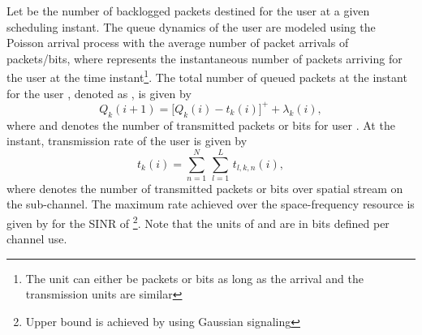 Let  be the number of backlogged packets destined for the user  at a given scheduling instant. The queue dynamics of the user  are modeled using the Poisson arrival process with the average number of packet arrivals of  packets/bits, where  represents the instantaneous number of packets arriving for the user  at the  time instant\footnote{The unit can either be packets or bits as long as the arrival and the transmission units are similar}. The total number of queued packets at the  instant for the user , denoted as , is given by
\begin{equation}
Q_k(i+1) = \Big [ Q_k(i) - t_k(i) \Big ]^+ + \lambda_k(i),
\label{eqn-2a}
\end{equation}
where  and  denotes the number of transmitted packets or bits for user . At the  instant, transmission rate of the user  is given by
\begin{equation}
t_k(i) = \sum_{n = 1}^N \, \sum_{l = 1}^L \, t_{l,k,n}(i),
\end{equation}
where  denotes the number of transmitted packets or bits over  spatial stream on the  sub-channel. The maximum rate achieved over the  space-frequency resource is given by  for the \ac{SINR} of \footnote{Upper bound is achieved by using Gaussian signaling}. Note that the units of  and  are in bits defined per channel use. 